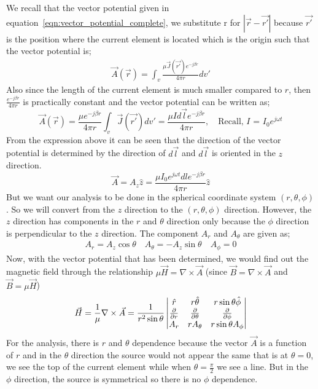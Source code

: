 We recall that the vector potential given in equation~\eqref{eqn:vector_potential_complete}, we substitute r for $|\vec{r} - \vec{r'}|$ because $\vec{r'}$ is the position where the current element is located which is the origin such that the vector potential is;
\begin{align}
\vec{A}(\vec{r}) =\int_v \frac{\mu \vec{J}(\vec{r'}) e^{-j\beta r}}{4\pi r}dv'
\label{eq:vector_potential_lec48}
\end{align} 
Also since the length of the current element is much smaller compared to $r$, then $\frac{e^{-j\beta r}}{4 \pi r}$ is practically constant and the vector potential can be written as;
\begin{dmath*}
\vec{A}(\vec{r}) = \frac{\mu e^{-j\beta r}}{4 \pi r}\int_v\vec{J}(\vec{r'})dv'
= \frac{\mu I d\vec{l} e^{-j\beta r}}{4\pi r},\quad\text{Recall, }I\text{ = }I_0e^{j\omega t}
\end{dmath*}
From the expression above it can be seen that the direction of the vector potential is determined by the direction of $d\vec{l}$ and $d\vec{l}$ is oriented in the $z$ direction. 
\begin{dmath*}
\vec{A} = A_z\hat{z}
= \frac{\mu I_0 e^{j\omega t} dl e^{-j\beta r}}{4\pi r}\hat{z}
\end{dmath*}
But we want our analysis to be done in the spherical coordinate system $(r, \theta, \phi)$. So we will convert from the $z$ direction to the $(r, \theta, \phi)$ direction. However, the $z$ direction has components in the $r$ and $\theta$ direction only because the $\phi$ direction is perpendicular to the $z$ direction. The component $A_{r}$ and $A_{\theta}$ are given as;
\begin{align*}
A_{r} = A_z\cos\theta\quad A_{\theta} = - A_z\sin\theta\quad A_{\phi} = 0
\end{align*}
Now, with the vector potential that has been determined, we would find out the magnetic field through the relationship $\mu \vec{H} = \nabla \times \vec{A}$ (since $\vec{B} = \nabla \times \vec{A}$ and $ \vec{B} = \mu \vec{H}$)
\begin{dmath*}
\vec{H} = \frac{1}{\mu} \nabla \times \vec{A} = \frac{1}{r^2\sin\theta}
\begin{vmatrix}
\hat{r} & r\hat{\theta} & r\sin\theta\hat{\phi} \\
\partialderivative{}{r} &  \partialderivative{}{\theta} &  \partialderivative{}{\phi} \\
A_r & rA_{\theta} & r\sin\theta A_{\phi}
\end{vmatrix}
\end{dmath*}
For the analysis, there is $r$ and $\theta$ dependence because the vector $\vec{A}$ is a function of $r$ and in the $\theta$ direction the source would not appear the same that is at $\theta = 0$, we see the top of the current element while when $\theta = \frac{\pi}{2}$ we see a line. But in the $\phi$ direction, the source is symmetrical so there is no $\phi$ dependence.

